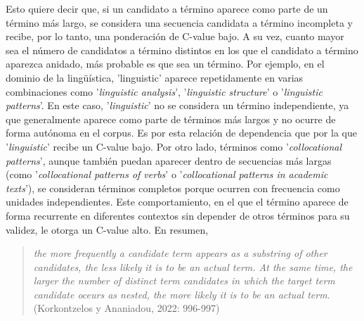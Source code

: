\begin{itemize}
Esto quiere decir que, si un candidato a término aparece como parte de un término más largo, se considera una secuencia candidata a término incompleta y recibe, por lo tanto, una ponderación de C-value bajo. A su vez, cuanto mayor sea el número de candidatos a término distintos en los que el candidato a término aparezca anidado, más probable es que sea un término. Por ejemplo, en el dominio de la lingüística, 'linguistic' aparece repetidamente en varias combinaciones como '\textit{linguistic analysis}', '\textit{linguistic structure}' o '\textit{linguistic patterns}'. En este caso, '\textit{linguistic}' no se considera un término independiente, ya que generalmente aparece como parte de términos más largos y no ocurre de forma autónoma en el corpus. Es por esta relación de dependencia que por la que '\textit{linguistic}' recibe un C-value bajo. Por otro lado, términos como '\textit{collocational patterns}', aunque también puedan aparecer dentro de secuencias más largas (como '\textit{collocational patterns of verbs}' o '\textit{collocational patterns in academic texts}'), se consideran términos completos porque ocurren con frecuencia como unidades independientes. Este comportamiento, en el que el término aparece de forma recurrente en diferentes contextos sin depender de otros términos para su validez, le otorga un C-value alto. En resumen,

\begin{quote}
\textit{the more frequently a candidate term appears as a substring of other candidates, the less likely it is to be an actual term. At the same time, the larger the number of distinct term candidates in which the target term candidate oceurs as nested, the more likely it is to be an actual term. }(Korkontzelos y Ananiadou, 2022: 996-997)

\end{quote}


\end{itemize}
